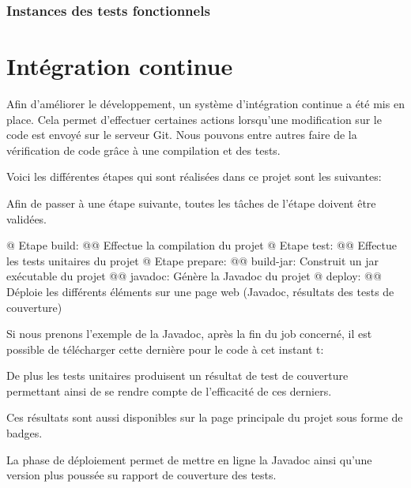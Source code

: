 \documentclass[final]{polytech/polytech}
\begin{document}
		\subsection{Instances des tests fonctionnels}

\chapter{Intégration continue\label{sec:ci}}
	Afin d'améliorer le développement, un système d'intégration continue a été mis en place.
	Cela permet d'effectuer certaines actions lorsqu'une modification sur le code est envoyé sur le serveur Git.
	Nous pouvons entre autres faire de la vérification de code grâce à une compilation et des tests.
	
	Voici les différentes étapes qui sont réalisées dans ce projet sont les suivantes:
	
	Afin de passer à une étape suivante, toutes les tâches de l'étape doivent être validées.
		
	\begin{easylist}
		@ Etape build:
		@@ Effectue la compilation du projet
		@ Etape test:
		@@ Effectue les tests unitaires du projet
		@ Etape prepare:
		@@ build-jar: Construit un jar exécutable du projet
		@@ javadoc: Génère la Javadoc du projet
		@ deploy:
		@@ Déploie les différents éléments sur une page web (Javadoc, résultats des tests de couverture)
	\end{easylist}
	
	Si nous prenons l'exemple de la Javadoc, après la fin du job concerné, il est possible de télécharger cette dernière pour le code à cet instant t:
	
	De plus les tests unitaires produisent un résultat de test de couverture permettant ainsi de se rendre compte de l'efficacité de ces derniers. 
	
	Ces résultats sont aussi disponibles sur la page principale du projet sous forme de badges.
	
	La phase de déploiement permet de mettre en ligne la Javadoc ainsi qu'une version plus poussée su rapport de couverture des tests.
	
\end{document}
